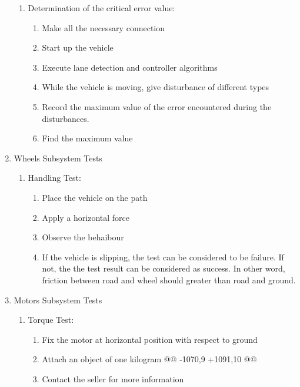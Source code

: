 \documentclass[a4paper,12pt]{article}
\begin{document}
\begin{enumerate}
\begin{enumerate}
		\item Determination of the critical error value: 
		\begin{enumerate}
			\item Make all the necessary connection
			\item Start up the vehicle
			\item Execute lane detection and controller algorithms
			\item While the vehicle is moving, give disturbance of different types
			\item Record the maximum value of the error encountered during the disturbances.
			\item Find the maximum value
		\end{enumerate}
		
		\end{enumerate}





		\item Wheels Subsystem Tests

		\begin{enumerate}
				\item {Handling Test:} 
				\begin{enumerate}
					\item  Place the vehicle on the path
					\item Apply a horizontal force
					\item Observe the behaibour 
					\item If the vehicle is slipping, the test can be considered to be failure. If not, the the test result can be considered as success. In other word, friction between road and wheel should greater than road and ground. 

				\end{enumerate}
		\end{enumerate}

		\item Motors Subsystem Tests

		\begin{enumerate}
				\item {Torque Test:} 
				\begin{enumerate}
					\item Fix the motor at horizontal position with respect to ground  
					\item Attach an object of one kilogram  
@@ -1070,9 +1091,10 @@
					\item Contact the seller for more information 
				\end{enumerate}
		\end{enumerate}
		

\end{enumerate}
\end{document}
